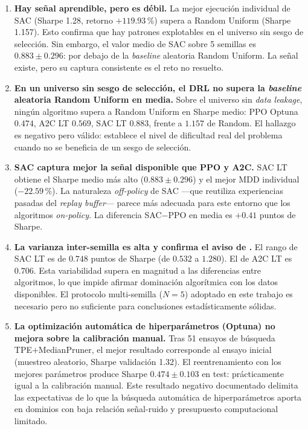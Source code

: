 \documentclass[IB,a4paper]{TFUOC}
\begin{document}
\begin{enumerate}
    \item \textbf{Hay señal aprendible, pero es débil.} La mejor ejecución individual de SAC (Sharpe 1.28, retorno $+119.93$\,\%) supera a Random Uniform (Sharpe 1.157). Esto confirma que hay patrones explotables en el universo sin sesgo de selección. Sin embargo, el valor medio de SAC sobre 5 semillas es $0.883 \pm 0.296$: por debajo de la \textit{baseline} aleatoria Random Uniform. La señal existe, pero su captura consistente es el reto no resuelto.

    \item \textbf{En un universo sin sesgo de selección, el DRL no supera la \textit{baseline} aleatoria Random Uniform en media.} Sobre el universo sin \textit{data leakage}, ningún algoritmo supera a Random Uniform en Sharpe medio: PPO Optuna $0.474$, A2C LT $0.569$, SAC LT $0.883$, frente a $1.157$ de Random. El hallazgo es negativo pero válido: establece el nivel de dificultad real del problema cuando no se beneficia de un sesgo de selección.

    \item \textbf{SAC captura mejor la señal disponible que PPO y A2C.} SAC LT obtiene el Sharpe medio más alto ($0.883 \pm 0.296$) y el mejor MDD individual ($-22.59$\,\%). La naturaleza \textit{off-policy} de SAC —que reutiliza experiencias pasadas del \textit{replay buffer}— parece más adecuada para este entorno que los algoritmos \textit{on-policy}. La diferencia SAC$-$PPO en media es $+0.41$ puntos de Sharpe.

    \item \textbf{La varianza inter-semilla es alta y confirma el aviso de \citet{henderson2018deeprl}.} El rango de SAC LT es de $0.748$ puntos de Sharpe (de $0.532$ a $1.280$). El de A2C LT es $0.706$. Esta variabilidad supera en magnitud a las diferencias entre algoritmos, lo que impide afirmar dominación algorítmica con los datos disponibles. El protocolo multi-semilla ($N=5$) adoptado en este trabajo es necesario pero no suficiente para conclusiones estadísticamente sólidas.

    \item \textbf{La optimización automática de hiperparámetros (Optuna) no mejora sobre la calibración manual.} Tras 51 ensayos de búsqueda TPE+MedianPruner, el mejor resultado corresponde al ensayo inicial (muestreo aleatorio, Sharpe validación 1.32). El reentrenamiento con los mejores parámetros produce Sharpe $0.474 \pm 0.103$ en test: prácticamente igual a la calibración manual. Este resultado negativo documentado delimita las expectativas de lo que la búsqueda automática de hiperparámetros aporta en dominios con baja relación señal-ruido y presupuesto computacional limitado.
\end{enumerate}
\end{document}
